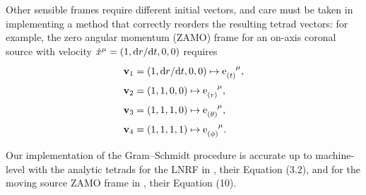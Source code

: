Other sensible frames require different initial vectors, and care must be taken in implementing a method that correctly reorders the resulting tetrad vectors: for example, the zero angular momentum (ZAMO) frame for an on-axis coronal source with velocity $\dot{x}^\mu = (1, \text{d} r / \text{d} t, 0, 0)$ requires
\begin{align}
    \vector{v}_1 &= \left(1, \d r / \d t, 0, 0 \right) \mapsto \dtensor{\e}{(t)}{\mu}, \nonumber \\
    \vector{v}_2 &= \left(1, 1, 0, 0\right) \mapsto \dtensor{\e}{(r)}{\mu}, \nonumber \\
    \vector{v}_3 &= \left(1, 1, 1, 0\right) \mapsto \dtensor{\e}{(\theta)}{\mu}, \nonumber \\
    \vector{v}_4 &= \left(1, 1, 1, 1\right) \mapsto \dtensor{\e}{(\phi)}{\mu}.
\end{align}

Our implementation of the Gram--Schmidt procedure is accurate up to machine-level with the analytic tetrads for the LNRF in \cite{bardeen_rotating_1972}, their Equation (3.2), and for the moving source ZAMO frame in \cite{gonzalez_probing_2017}, their Equation (10).
